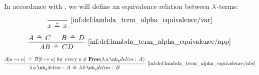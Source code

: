 \begin{definition}\label{def:lambda_term_alpha_equivalence}\mimprovised
  In accordance with , we will define an equivalence relation between \( \mathrm{\lambda} \)-terms:

  \begin{paracol}{2}
    \begin{leftcolumn}
      \begin{equation*}\taglabel[\ensuremath{ \logic{Var}_\alpha }]{inf:def:lambda_term_alpha_equivalence/var}
        \begin{prooftree}
          \infer0[\ref{inf:def:lambda_term_alpha_equivalence/var}]{ x \aequiv x }
        \end{prooftree}
      \end{equation*}
    \end{leftcolumn}

    \begin{rightcolumn}
      \begin{equation*}\taglabel[\ensuremath{ \logic{App}_\alpha }]{inf:def:lambda_term_alpha_equivalence/app}
        \begin{prooftree}
          \hypo{ A \aequiv C }
          \hypo{ B \aequiv D }
          \infer2[\ref{inf:def:lambda_term_alpha_equivalence/app}]{ AB \aequiv CD }
        \end{prooftree}
      \end{equation*}
    \end{rightcolumn}
  \end{paracol}

  \begin{equation*}\taglabel[\ensuremath{ \logic{Abs}_\alpha }]{inf:def:lambda_term_alpha_equivalence/abs}
    \begin{prooftree}
      \hypo{ A[a \mapsto n] \aequiv B[b \mapsto n] \T{for every} n \not\in \op*{Free}(\qabs a A) }
      \infer1[\ref{inf:def:lambda_term_alpha_equivalence/abs}]{ \qabs a A \aequiv \qabs b B }
    \end{prooftree}
  \end{equation*}
\end{definition}
